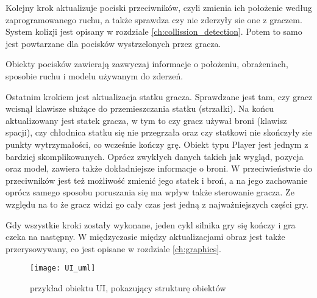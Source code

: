 Kolejny krok aktualizuje pociski przeciwników, czyli zmienia ich położenie według zaprogramowanego ruchu, a także sprawdza czy nie zderzyły sie one z graczem. System kolizji jest opisany w rozdziale \ref{ch:collission_detection}. Potem to samo jest powtarzane dla pocisków wystrzelonych przez gracza.

Obiekty pocisków zawierają zazwyczaj informacje o położeniu, obrażeniach, sposobie ruchu i modelu używanym do zderzeń.\smallskip

Ostatnim krokiem jest aktualizacja statku gracza. Sprawdzane jest tam, czy gracz wcisnął klawisze służące do przemieszczania statku (strzałki). Na końcu aktualizowany jest statek gracza, w tym to czy gracz używał broni (klawisz spacji), czy chłodnica statku się nie przegrzała oraz czy statkowi nie skończyły sie punkty wytrzymało\'sci, co wcze\'snie kończy grę.
Obiekt typu Player jest jednym z bardziej skomplikowanych. Oprócz zwykłych danych takich jak wygląd, pozycja oraz model, zawiera także dokładniejsze informacje o broni. W przeciwieństwie do przeciwników jest też możliwo\'sć zmienić jego statek i broń, a na jego zachowanie oprócz samego sposobu poruszania się ma wpływ także sterowanie gracza. Ze względu na to że gracz widzi go cały czas jest jedną z najważniejszych czę\'sci gry.\bigskip

Gdy wszystkie kroki zostały wykonane, jeden cykl silnika gry się kończy i gra czeka na następny. W międzyczasie między aktualizacjami obraz jest także przerysowywany, co jest opisane w rozdziale \ref{ch:graphics}.\newpage

\begin{wrapfigure}{r}{\textwidth}
	\centering
	\noindent\texttt{[image: UI\_uml]}
	\caption{przykład obiektu UI, pokazujący strukturę obiektów}
\end{wrapfigure}

\cleardoublepage